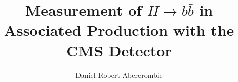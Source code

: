 % 
% 
%
%
%
%
%
%
%
%
% 
% 

\title{Measurement of $H\rightarrow b\bar{b}$ in Associated Production with the CMS Detector}

\author{Daniel Robert Abercrombie}


